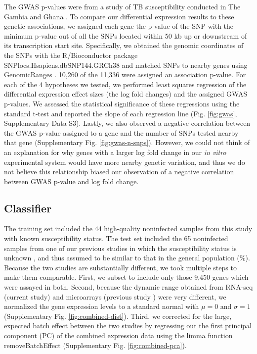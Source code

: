 \documentclass[fleqn,10pt]{wlscirep}
\begin{document}
The GWAS p-values were from a study of TB susceptibility conducted in
The Gambia and Ghana \cite{Thye2010}. To compare our differential
expression results to these genetic associations, we assigned each
gene the p-value of the SNP with the minimum p-value out of all the
SNPs located within 50 kb up or downstream of its transcription start
site. Specifically, we obtained the genomic coordinates of the SNPs
with the R/Bioconductor \cite{Huber2015} package
SNPlocs.Hsapiens.dbSNP144.GRCh38 and matched SNPs to nearby genes
using GenomicRanges \cite{Lawrence2013}. 10,260 of the 11,336 were
assigned an association p-value. For each of the 4 hypotheses we
tested, we performed least squares regression of the differential
expression effect sizes (the log fold changes) and the assigned GWAS
p-values. We assessed the statistical significance of these
regressions using the standard t-test and reported the slope of each
regression line (Fig. \ref{fig:gwas}, Supplementary Data S3).  Lastly,
we also observed a negative correlation between the GWAS p-value
assigned to a gene and the number of SNPs tested nearby that gene
(Supplementary Fig. \ref{fig:gwas-n-snps}). However, we could not
think of an explanation for why genes with a larger log fold change in
our \emph{in vitro} experimental system would have more nearby genetic
variation, and thus we do not believe this relationship biased our
observation of a negative correlation between GWAS p-value and log
fold change.
\subsection*{Classifier}

The training set included the 44 high-quality noninfected samples from
this study with known susceptibility status. The test set included the
65 noninfected samples from one of our previous studies in which the
susceptibility status is unknown \cite{Barreiro2012}, and thus assumed
to be similar to that in the general population (\%).
Because the two studies are substantially different, we took multiple
steps to make them comparable. First, we subset to include only those
9,450 genes which were assayed in both. Second, because the dynamic
range obtained from RNA-seq (current study) and microarrays (previous
study \cite{Barreiro2012}) were very different, we normalized the gene
expression levels to a standard normal with $\mu = 0$ and $\sigma = 1$
(Supplementary Fig. \ref{fig:combined-dist}). Third, we corrected for
the large, expected batch effect between the two studies by regressing
out the first principal component (PC) of the combined expression data
using the limma function removeBatchEffect \cite{Ritchie2015}
(Supplementary Fig. \ref{fig:combined-pca}).
\end{document}
